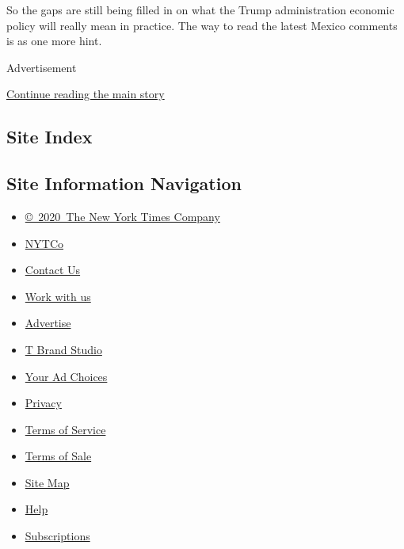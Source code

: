 So the gaps are still being filled in on what the Trump administration
economic policy will really mean in practice. The way to read the latest
Mexico comments is as one more hint.

Advertisement

\protect\hyperlink{after-bottom}{Continue reading the main story}

\hypertarget{site-index}{%
\subsection{Site Index}\label{site-index}}

\hypertarget{site-information-navigation}{%
\subsection{Site Information
Navigation}\label{site-information-navigation}}

\begin{itemize}
\tightlist
\item
  \href{https://help.nytimes.com/hc/en-us/articles/115014792127-Copyright-notice}{©~2020~The
  New York Times Company}
\end{itemize}

\begin{itemize}
\tightlist
\item
  \href{https://www.nytco.com/}{NYTCo}
\item
  \href{https://help.nytimes.com/hc/en-us/articles/115015385887-Contact-Us}{Contact
  Us}
\item
  \href{https://www.nytco.com/careers/}{Work with us}
\item
  \href{https://nytmediakit.com/}{Advertise}
\item
  \href{http://www.tbrandstudio.com/}{T Brand Studio}
\item
  \href{https://www.nytimes.com/privacy/cookie-policy\#how-do-i-manage-trackers}{Your
  Ad Choices}
\item
  \href{https://www.nytimes.com/privacy}{Privacy}
\item
  \href{https://help.nytimes.com/hc/en-us/articles/115014893428-Terms-of-service}{Terms
  of Service}
\item
  \href{https://help.nytimes.com/hc/en-us/articles/115014893968-Terms-of-sale}{Terms
  of Sale}
\item
  \href{https://spiderbites.nytimes.com}{Site Map}
\item
  \href{https://help.nytimes.com/hc/en-us}{Help}
\item
  \href{https://www.nytimes.com/subscription?campaignId=37WXW}{Subscriptions}
\end{itemize}
